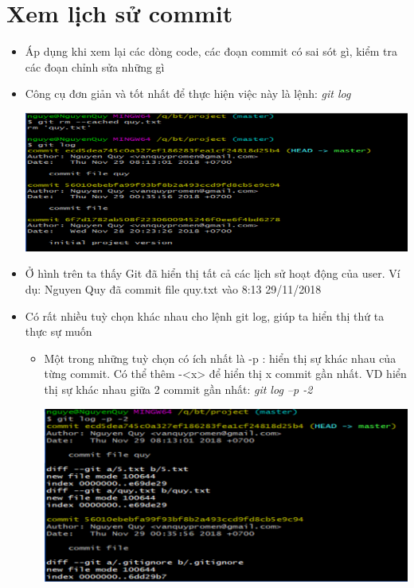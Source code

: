\documentclass[12pt,a4paper]{report}
\begin{document}
\section{Xem lịch sử commit}
\begin{itemize}
\item Áp dụng khi xem lại các dòng code, các đoạn commit có sai sót gì, kiểm tra các đoạn chỉnh sửa những gì\vskip 0.4cm
\item Công cụ đơn giản và tốt nhất để thực hiện việc này là lệnh: {\it git log}

	\includegraphics[width=0.8\linewidth]{screenshot017}

	\label{fig:screenshot017}

\item Ở hình trên ta thấy Git đã hiển thị tất cả các lịch sử hoạt động của user. Ví dụ: Nguyen Quy đã commit file quy.txt vào 8:13 29/11/2018\vskip 0.4cm
\item Có rất nhiều tuỳ chọn khác nhau cho lệnh git log, giúp ta hiển thị thứ ta thực sự muốn
	\begin{itemize}
		\item Một trong những tuỳ chọn có ích nhất là -p : hiển thị sự khác nhau của từng commit. Có thể thêm -<x> để hiển thị x commit gần nhất. VD hiển thị sự khác nhau giữa 2 commit gần nhất: {\it git log –p -2}

	\includegraphics[width=0.8\linewidth]{screenshot018}
	
	\label{fig:screenshot018}


\end{itemize}
\end{itemize}
\end{document}
